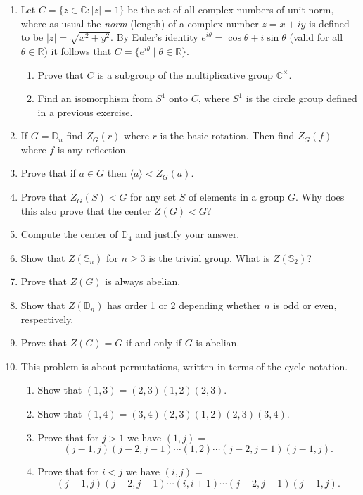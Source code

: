 \documentclass[11pt]{article}
\newenvironment{problems}
{
 \begin{enumerate}[topsep=1pt,itemsep=0pt,parsep=2pt,leftmargin=0.6cm,%
 label={\arabic*.}, ref=\arabic*] \small
}
{
 \end{enumerate}
}
\theoremstyle{definition}
\newcommand{\R}{\mathbb{R}} %
\newcommand{\C}{\mathbb{C}} %
\newcommand{\gen}[1]{\langle #1 \rangle}
\newcommand{\Sym}{\mathbb{S}}
\newcommand{\D}{\mathbb{D}}
\begin{document}
\begin{problems}
\item Let $C = \{z \in \C \colon |z| = 1\}$ be the set of all complex
  numbers of unit norm, where as usual the \emph{norm} (length) of a
  complex number $z = x+iy$ is defined to be $|z| = \sqrt{x^2+y^2}$.
  By Euler's identity $e^{i\theta} = \cos \theta + i \sin \theta$
  (valid for all $\theta \in \R$) it follows that $C = \{ e^{i\theta}
  \mid \theta \in \R \}$.
  \begin{enumerate}
  \item Prove that $C$ is a subgroup of the multiplicative group
    $\C^\times$. 
  \item Find an isomorphism from $S^1$ onto $C$, where $S^1$ is the
    circle group defined in a previous exercise.
  \end{enumerate}


\item If $G = \D_n$ find $Z_G(r)$ where $r$ is the basic
  rotation. Then find $Z_G(f)$ where $f$ is any reflection.

\item Prove that if $a \in G$ then $\gen{a} < Z_G(a)$. 

\item Prove that $Z_G(S) < G$ for any set $S$ of elements in a group
  $G$. Why does this also prove that the center $Z(G) < G$?

\item Compute the center of $\D_4$ and justify your answer.

\item Show that $Z(\Sym_n)$ for $n \ge 3$ is the trivial group.  What
  is $Z(\Sym_2)$?

\item Prove that $Z(G)$ is always
  abelian.

\item Show that $Z(\D_n)$ has order 1 or 2 depending whether $n$ is
  odd or even, respectively.


\item Prove that $Z(G) = G$ if and only if $G$ is abelian. 

\item \label{exer:adjacent} This problem is about permutations, written
  in terms of the cycle notation.
 \begin{enumerate}
  \item Show that $(1,3) = (2,3)(1,2)(2,3)$. 
  \item Show that $(1,4) = (3,4)(2,3)(1,2)(2,3)(3,4)$.
  \item Prove that for $j > 1$ we have $(1,j) =$
  $$(j-1,j)(j-2,j-1)\cdots(1,2)\cdots(j-2,j-1)(j-1,j).$$
  \item Prove that for $i < j$ we have $(i,j) =$
  $$(j-1,j)(j-2,j-1)\cdots(i,i+1)\cdots(j-2,j-1)(j-1,j).$$


\end{enumerate}
\end{problems}
\end{document}

